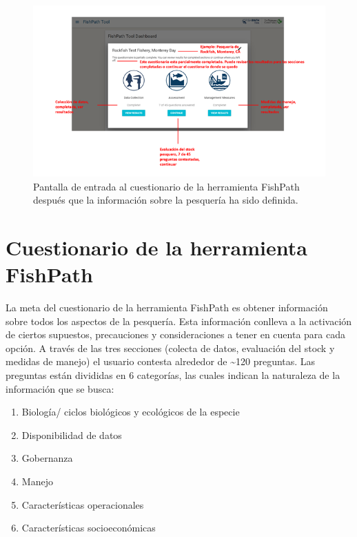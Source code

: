 \documentclass[
  11pt,
]{book}
\providecommand{\tightlist}{%
  \setlength{\itemsep}{0pt}\setlength{\parskip}{0pt}}
\begin{document}
\begin{figure}

{\centering \includegraphics[width=0.95\linewidth]{images/fishery-entry-screen-es} 

}

\caption{Pantalla de entrada al cuestionario de la herramienta FishPath después que la información sobre la pesquería ha sido definida.}\label{fig:fishery-entry}
\end{figure}

\hypertarget{cuestionario-de-la-herramienta-fishpath}{%
\chapter{Cuestionario de la herramienta FishPath}\label{cuestionario-de-la-herramienta-fishpath}}

La meta del cuestionario de la herramienta FishPath es obtener información sobre todos los aspectos de la pesquería. Esta información conlleva a la activación de ciertos supuestos, precauciones y consideraciones a tener en cuenta para cada opción. A través de las tres secciones (colecta de datos, evaluación del stock y medidas de manejo) el usuario contesta alrededor de \textasciitilde120 preguntas. Las preguntas están divididas en 6 categorías, las cuales indican la naturaleza de la información que se busca:

\begin{enumerate}
\def\labelenumi{\arabic{enumi}.}
\tightlist
\item
  Biología/ ciclos biológicos y ecológicos de la especie
\item
  Disponibilidad de datos
\item
  Gobernanza
\item
  Manejo
\item
  Características operacionales
\item
  Características socioeconómicas
\end{enumerate}
\end{document}
